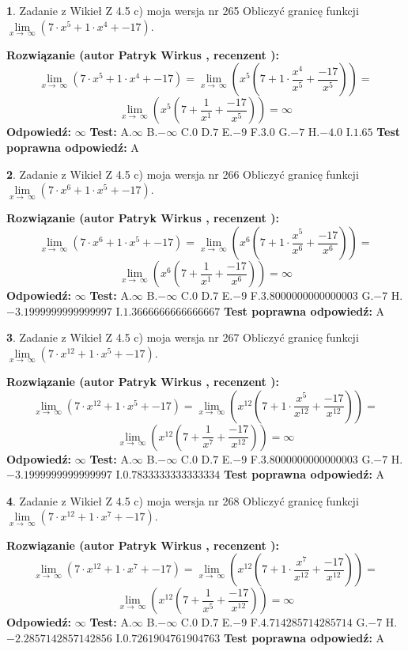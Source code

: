 \documentclass[12pt, a4paper]{article}
\theoremstyle{definition} %
\newtheorem{zad}{}
\newcommand{\zadStart}[1]{\begin{zad}#1\newline}
\newcommand{\zadStop}{\end{zad}}
\newcommand{\rozwStart}[2]{\noindent \textbf{Rozwiązanie (autor #1 , recenzent #2): }\newline}
\newcommand{\rozwStop}{\newline}
\newcommand{\odpStart}{\noindent \textbf{Odpowiedź:}\newline}
\newcommand{\odpStop}{\newline}
\newcommand{\testStart}{\noindent \textbf{Test:}\newline}
\newcommand{\testStop}{\newline}
\newcommand{\kluczStart}{\noindent \textbf{Test poprawna odpowiedź:}\newline}
\newcommand{\kluczStop}{\newline}
\begin{document}
\zadStart{Zadanie z Wikieł Z 4.5 c) moja wersja nr 265}
Obliczyć granicę funkcji  $\lim\limits_{x\to\ \infty}(7 \cdot x^{5}+1 \cdot x^{4}+-17)$.
\zadStop
\rozwStart{Patryk Wirkus}{}
$$\lim\limits_{x\to\ \infty}(7 \cdot x^{5}+1 \cdot x^{4}+-17) = \lim\limits_{x\to\ \infty}(x^{5}(7 +1 \cdot \frac{x^{4}}{x^{5}}+\frac{-17}{x^{5}})) =$$ $$\lim\limits_{x\to\ \infty}(x^{5}(7 +\frac{1}{x^{1}}+\frac{-17}{x^{5}})) =\infty$$
\rozwStop
\odpStart
$\infty$
\odpStop
\testStart
A.$\infty$ B.$-\infty$ C.$0$ D.$7$ E.$-9$
F.$3.0$ G.$-7$
H.$-4.0$
I.$1.65$
\testStop
\kluczStart
A
\kluczStop



\zadStart{Zadanie z Wikieł Z 4.5 c) moja wersja nr 266}
Obliczyć granicę funkcji  $\lim\limits_{x\to\ \infty}(7 \cdot x^{6}+1 \cdot x^{5}+-17)$.
\zadStop
\rozwStart{Patryk Wirkus}{}
$$\lim\limits_{x\to\ \infty}(7 \cdot x^{6}+1 \cdot x^{5}+-17) = \lim\limits_{x\to\ \infty}(x^{6}(7 +1 \cdot \frac{x^{5}}{x^{6}}+\frac{-17}{x^{6}})) =$$ $$\lim\limits_{x\to\ \infty}(x^{6}(7 +\frac{1}{x^{1}}+\frac{-17}{x^{6}})) =\infty$$
\rozwStop
\odpStart
$\infty$
\odpStop
\testStart
A.$\infty$ B.$-\infty$ C.$0$ D.$7$ E.$-9$
F.$3.8000000000000003$ G.$-7$
H.$-3.1999999999999997$
I.$1.3666666666666667$
\testStop
\kluczStart
A
\kluczStop



\zadStart{Zadanie z Wikieł Z 4.5 c) moja wersja nr 267}
Obliczyć granicę funkcji  $\lim\limits_{x\to\ \infty}(7 \cdot x^{12}+1 \cdot x^{5}+-17)$.
\zadStop
\rozwStart{Patryk Wirkus}{}
$$\lim\limits_{x\to\ \infty}(7 \cdot x^{12}+1 \cdot x^{5}+-17) = \lim\limits_{x\to\ \infty}(x^{12}(7 +1 \cdot \frac{x^{5}}{x^{12}}+\frac{-17}{x^{12}})) =$$ $$\lim\limits_{x\to\ \infty}(x^{12}(7 +\frac{1}{x^{7}}+\frac{-17}{x^{12}})) =\infty$$
\rozwStop
\odpStart
$\infty$
\odpStop
\testStart
A.$\infty$ B.$-\infty$ C.$0$ D.$7$ E.$-9$
F.$3.8000000000000003$ G.$-7$
H.$-3.1999999999999997$
I.$0.7833333333333334$
\testStop
\kluczStart
A
\kluczStop



\zadStart{Zadanie z Wikieł Z 4.5 c) moja wersja nr 268}
Obliczyć granicę funkcji  $\lim\limits_{x\to\ \infty}(7 \cdot x^{12}+1 \cdot x^{7}+-17)$.
\zadStop
\rozwStart{Patryk Wirkus}{}
$$\lim\limits_{x\to\ \infty}(7 \cdot x^{12}+1 \cdot x^{7}+-17) = \lim\limits_{x\to\ \infty}(x^{12}(7 +1 \cdot \frac{x^{7}}{x^{12}}+\frac{-17}{x^{12}})) =$$ $$\lim\limits_{x\to\ \infty}(x^{12}(7 +\frac{1}{x^{5}}+\frac{-17}{x^{12}})) =\infty$$
\rozwStop
\odpStart
$\infty$
\odpStop
\testStart
A.$\infty$ B.$-\infty$ C.$0$ D.$7$ E.$-9$
F.$4.714285714285714$ G.$-7$
H.$-2.2857142857142856$
I.$0.7261904761904763$
\testStop
\kluczStart
A
\kluczStop
\end{document}
